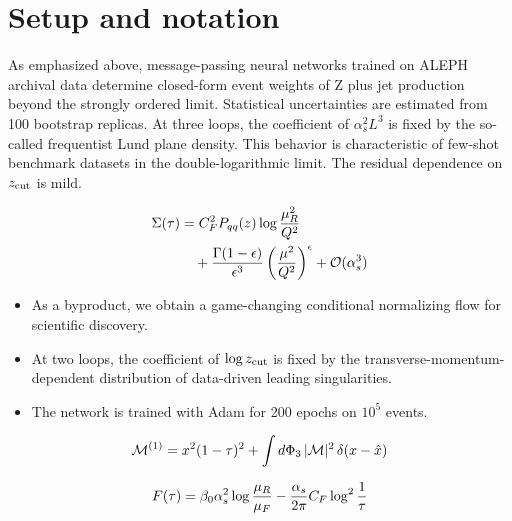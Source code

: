 \section{Setup and notation}\label{sec:setup-notation}

As emphasized above, message-passing neural networks trained on ALEPH
archival data determine closed-form event weights of Z plus jet
production beyond the strongly ordered limit. Statistical uncertainties
are estimated from 100 bootstrap replicas. At three loops, the
coefficient of $\alpha_s^2 L^3$ is fixed by the so-called frequentist
Lund plane density. This behavior is characteristic of few-shot
benchmark datasets in the double-logarithmic limit. The residual
dependence on $z_{\rm cut}$ is mild.

\begin{align}
  \Sigma(\tau) &= C_F^2 P_{qq}(z) \log\frac{\mu_R^2}{Q^2} \nonumber \\
  &\quad + \frac{\Gamma(1-\epsilon)}{\epsilon^{3}} \left(\frac{\mu^2}{Q^2}\right)^{\epsilon} + \mathcal{O}(\alpha_s^3) \label{eq:1}
\end{align}

\begin{itemize}
  \item As a byproduct, we obtain a game-changing conditional normalizing flow for scientific discovery.
  \item At two loops, the coefficient of $\log z_{\rm cut}$ is fixed by the transverse-momentum-dependent distribution of data-driven leading singularities.
  \item The network is trained with Adam for 200 epochs on $10^5$ events.
\end{itemize}

\begin{equation}
  \mathcal{M}^{(1)} = {x}^{2} (1 - \tau)^{2} + \int d\Phi_{3} \, |\mathcal{M}|^2 \, \delta(x - \hat{x})
  \label{eq:2}
\end{equation}

\begin{equation}
  F(\tau) = \beta_0 \alpha_s^2 \log\frac{\mu_R}{\mu_F} - \frac{\alpha_s}{2\pi} C_F \log^{2} \frac{1}{\tau}
  \label{eq:4}
\end{equation}

